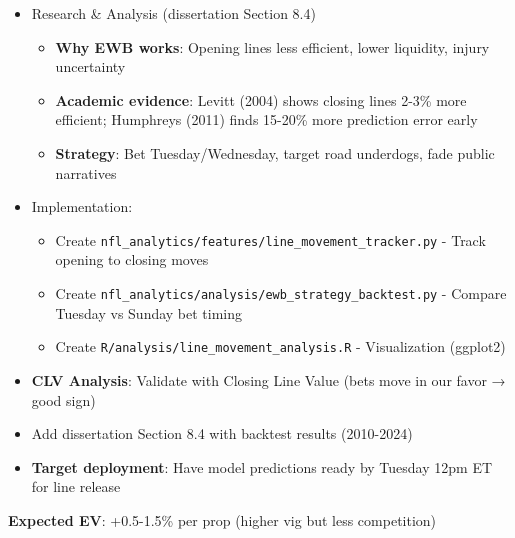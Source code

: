 \begin{itemize}
  \item {} Research \& Analysis (dissertation Section 8.4)
  \begin{itemize}
    \item \textbf{Why EWB works}: Opening lines less efficient, lower liquidity, injury uncertainty
    \item \textbf{Academic evidence}: Levitt (2004) shows closing lines 2-3\% more efficient; Humphreys (2011) finds 15-20\% more prediction error early
    \item \textbf{Strategy}: Bet Tuesday/Wednesday, target road underdogs, fade public narratives
  \end{itemize}
  \item {} Implementation:
  \begin{itemize}
    \item Create \texttt{nfl\_analytics/features/line\_movement\_tracker.py} - Track opening to closing moves
    \item Create \texttt{nfl\_analytics/analysis/ewb\_strategy\_backtest.py} - Compare Tuesday vs Sunday bet timing
    \item Create \texttt{R/analysis/line\_movement\_analysis.R} - Visualization (ggplot2)
  \end{itemize}
  \item {} \textbf{CLV Analysis}: Validate with Closing Line Value (bets move in our favor → good sign)
  \item {} Add dissertation Section 8.4 with backtest results (2010-2024)
  \item \textbf{Target deployment}: Have model predictions ready by Tuesday 12pm ET for line release
\end{itemize}

\textbf{Expected EV}: +0.5-1.5\% per prop (higher vig but less competition)

